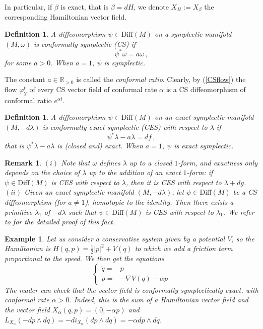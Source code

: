 \documentclass{article}
\newcommand{\1}{\mathbbm{1}}
\newtheorem{defn}[thm]{Definition}
\newtheorem{rem}[thm]{Remark}
\newtheorem{es}{Example}
\theoremstyle{remark}
\begin{document}
In particular, if $\beta$ is exact, that is $\beta =dH$, we denote $X_H := X_\beta$ the corresponding Hamiltonian vector field. 
\begin{defn}
A diffeomorphism $\psi \in \mathrm{Diff}(M)$ on a symplectic manifold $(M,\omega)$ is conformally symplectic (CS) if 
\begin{equation} \label{CSdiffeo}
\psi^* \omega = a \omega\, ,
\end{equation}
for some $a > 0$. When $a = 1$, $\psi$ is symplectic.
\end{defn}
\noindent The constant $a \in \mathbb{R}_{> 0}$ is called the \textit{conformal ratio}. Clearly, by (\ref{CSflow}) the flow $\varphi_Y^t$ of every CS vector field of conformal rate $\alpha$ is a CS diffeomorphism of conformal ratio $e^{\alpha t}$.
\begin{defn}
A diffeomorphism $\psi \in \mathrm{Diff}(M)$ on an exact symplectic manifold $(M,-d\lambda)$ is conformally exact symplectic (CES) with respect to $\lambda$ if 
$$\psi^* \lambda - a \lambda = df\, ,$$
that is $\psi^* \lambda - a \lambda$ is (closed and) exact. When $a = 1$, $\psi $ is exact symplectic.
\end{defn}
\begin{rem} $(i)$ \textnormal{Note that  $\omega$ defines $\lambda$ up to a closed $1$-form, and exactness only depends on the choice of $\lambda$ up to the addition of an exact $1$-form: if $\psi \in \mathrm{Diff}(M)$ is CES with respect to $\lambda$, then it is CES with respect to $\lambda+dg$.} \\
$(ii)$ \textnormal{Given an exact symplectic manifold $(M,-d\lambda)$, let $\psi \in \mathrm{Diff}(M)$ be a CS diffeomorphism (for $a \ne 1$), homotopic to the identity. Then there exists a primitive $\lambda_1$ of $-d\lambda$ such that $\psi \in \mathrm{Diff}(M)$ is CES with respect to $\lambda_1$. We refer to \cite[Appendix B Proposition 9]{arnFéj} for the detailed proof of this fact.}
\end{rem}
\begin{es}
\textnormal{Let us consider a conservative system given by a potential $V$, so the Hamiltonian  is $H(q,p)=\frac{1}{2} \vert p\vert^2+V(q)$ to which we add a friction term proportional to the speed. We then get the equations
    \begin{equation}
       \left\{ \begin{array}{cc}
            \dot q =&p  \\
             \dot p =& -\nabla V(q)-\alpha p 
        \end{array}
\right.
    \end{equation}
    The reader can check that the vector field is conformally symplectically exact, with conformal rate $\alpha > 0$. Indeed, this is the sum of a Hamiltonian vector field and the vector field $X_\alpha(q,p)=(0,-\alpha p)$ and $L_{X_\alpha}(-dp\wedge dq)=-di_{X_\alpha}(dp\wedge dq)=-\alpha dp\wedge dq$.}
\end{es}
\end{document}
